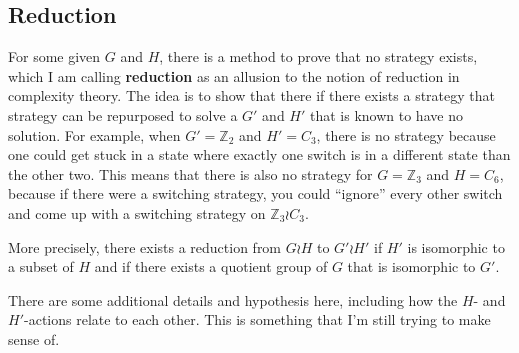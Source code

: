 \documentclass{article}
\numberwithin{equation}{subsection}
\begin{document}
\subsection{Reduction}
For some given $G$ and $H$, there is a method to prove that no strategy exists,
which I am calling \textbf{reduction} as an allusion to the notion of reduction
in complexity theory. The idea is to show that there if there exists a strategy
that strategy can be repurposed to solve a $G'$ and $H'$ that is known to have
no solution.
For example, when $G' = \mathbb Z_2$ and $H' = C_3$, there is no strategy
because one could get stuck in a state where exactly one switch is in a
different state than the other two. This means that there is also no
strategy for $G = \mathbb Z_3$ and $H = C_6$, because if there were a switching
strategy, you could ``ignore'' every other switch and come up with a switching
strategy on $\mathbb Z_3 \wr C_3$.

More precisely, there exists a reduction from $G \wr H$ to $G' \wr H'$ if
$H'$ is isomorphic to a subset of $H$ and if there exists a quotient group of
$G$ that is isomorphic to $G'$.

There are some additional details and hypothesis here, including how the
$H$- and $H'$-actions relate to each other.
This is something that I'm still trying to make sense of.
\end{document}
